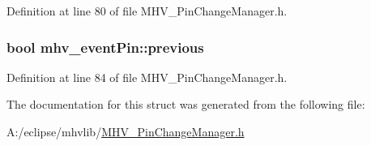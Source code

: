 \-Definition at line 80 of file \-M\-H\-V\-\_\-\-Pin\-Change\-Manager.\-h.

\hypertarget{structmhv__event_pin_a6c6bc6a868d6402c34a5024447473618}{
\subsubsection[{previous}]{\setlength{\rightskip}{0pt plus 5cm}bool {\bf mhv\-\_\-event\-Pin\-::previous}}}
\label{structmhv__event_pin_a6c6bc6a868d6402c34a5024447473618}


\-Definition at line 84 of file \-M\-H\-V\-\_\-\-Pin\-Change\-Manager.\-h.



\-The documentation for this struct was generated from the following file\-:\begin{DoxyCompactItemize}
\item 
\-A\-:/eclipse/mhvlib/\hyperlink{_m_h_v___pin_change_manager_8h}{\-M\-H\-V\-\_\-\-Pin\-Change\-Manager.\-h}\end{DoxyCompactItemize}
